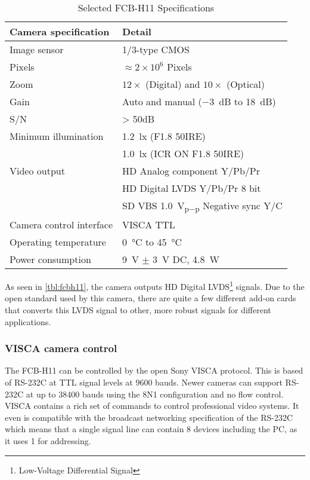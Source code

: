 \begin{table}[htbp]
	\centering
	\begin{tabular}{ll}
	
		\toprule
			Camera specification 	& Detail \\
		\midrule
			Image sensor 			& 1/3-type CMOS \\
			Pixels 					& $\approx2\times10^{6}$ Pixels \\
			Zoom 					& $12\times$ (Digital) and $10\times$ (Optical) \\
			Gain 					& Auto and manual (\SI{-3}{\deci\bel} to \SI{18}{\deci\bel}) \\
			S/N						& > 50dB \\
			Minimum illumination 	& \SI{1.2}{\lux} (F1.8 50IRE) \\
									& \SI{1.0}{\lux} (ICR ON F1.8 50IRE) \\
			Video output			& HD Analog component Y/Pb/Pr \\
									& HD Digital LVDS Y/Pb/Pr 8 bit \\
									& SD VBS \SI{1.0}{\volt_{p-p}} Negative sync Y/C \\
			Camera control interface& VISCA TTL \\
			Operating temperature	& \SI{0}{\celsius} to \SI{45}{\celsius} \\
			Power consumption		& \SI{9}{\volt} $\pm$ \SI{3}{\volt} DC, \SI{4.8}{\watt} \\
		\bottomrule
	\end{tabular}
	\caption{Selected FCB-H11 Specifications}
	\label{tbl:fcbh11}
\end{table}


As seen in \vref{tbl:fcbh11}, the camera outputs HD Digital LVDS\footnote{Low-Voltage Differential Signal} signals.
Due to the open standard used by this camera, there are quite a few different add-on cards that 
converts this LVDS signal to other, more robust signals for different applications.

\subsubsection{VISCA camera control}\label{sec:visca}
The FCB-H11 can be controlled by the open Sony VISCA protocol. This is based of RS-232C at TTL signal levels
at 9600 bauds. Newer cameras can support RS-232C at up to 38400 bauds using the 8N1 configuration and no flow control. 
VISCA contains a rich set of commands to control professional video systems. It even is compatible with 
the broadcast networking specification of the RS-232C which means that a single signal line can contain 
8 devices including the PC, as it uses \SI{1}{\byte} for addressing.

